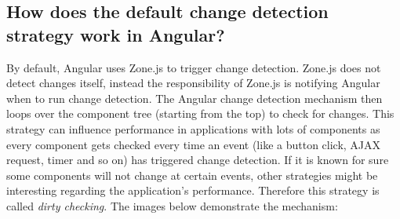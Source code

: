 \subsection{How does the default change detection strategy work in Angular?}
\label{sec:change_detection_default}
By default, Angular uses Zone.js to trigger change detection. Zone.js does not detect changes itself, instead the responsibility of Zone.js is notifying Angular when to run change detection. \autocite{Inatomi2020} The Angular change detection mechanism then loops over the component tree (starting from the top) to check for changes. This strategy can influence performance in applications with lots of components as every component gets checked every time an event (like a button click, AJAX request, timer and so on) has triggered change detection. If it is known for sure some components will not change at certain events, other strategies might be interesting regarding the application's performance. Therefore this strategy is called \emph{dirty checking}.
\autocite{Hoffmann2019}
The images below demonstrate the mechanism:
